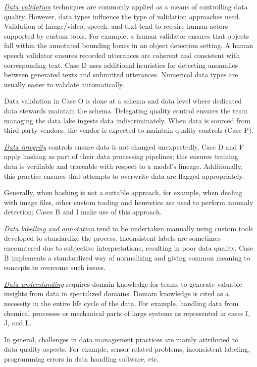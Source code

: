 \underline{\emph{Data validation}} techniques are commonly applied as a means of controlling data quality. However, data types influence the type of validation approaches used. Validation of Image/video, speech, and text tend to require human actors supported by custom tools. For example, a human validator ensures that objects fall within the annotated bounding boxes in an object detection setting. A human speech validator ensures recorded utterances are coherent and consistent with corresponding text. Case D uses additional heuristics for detecting anomalies between generated texts and submitted utterances. Numerical data types are usually easier to validate automatically.

Data validation in Case O is done at a schema and data level where dedicated data stewards maintain the schema. Delegating quality control ensures the team managing the data lake ingests data indiscriminately. When data is sourced from third-party vendors, the vendor is expected to maintain quality controls (Case P).


\underline{\emph{Data integrity}}
controls ensure data is not changed unexpectedly. Case D and F apply hashing as part of their data processing pipelines; this ensures training data is verifiable and traceable with respect to a model's lineage. Additionally, this practice ensures that attempts to overwrite data are flagged appropriately.

Generally, when hashing is not a suitable approach, for example, when dealing with image files, other custom tooling and heuristics are used to perform anomaly detection; Cases B and I make use of this approach.

\underline{\emph{Data labelling and annotation}} tend to be undertaken manually using custom tools developed to standardize the process. Inconsistent labels are sometimes encountered due to subjective interpretations, resulting in poor data quality. Case B implements a standardized way of normalizing and giving common meaning to concepts to overcome such issues. 

\underline{\emph{Data understanding}} requires domain knowledge for teams to generate valuable insights from data in specialized domains. Domain knowledge is cited as a necessity in the entire life cycle of the data. For example, handling data from chemical processes or mechanical parts of large systems as represented in cases I, J, and L.

In general, challenges in data management practices are mainly attributed to data quality aspects. For example, sensor related problems, inconsistent labeling, programming errors in data handling software, etc.